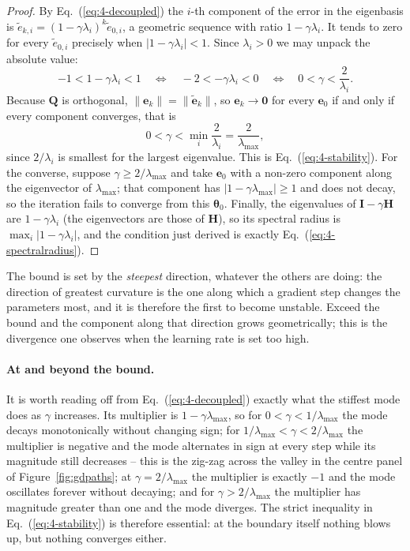 \begin{proof}
By Eq.~(\ref{eq:4-decoupled}) the $i$-th component of the error in the
eigenbasis is $\tilde{e}_{k,i}=(1-\gamma\lambda_i)^{k}\tilde{e}_{0,i}$, a
geometric sequence with ratio $1-\gamma\lambda_i$.  It tends to zero for
every $\tilde{e}_{0,i}$ precisely when $|1-\gamma\lambda_i|<1$.  Since
$\lambda_i>0$ we may unpack the absolute value:
\begin{equation*}
  -1 < 1-\gamma\lambda_i < 1
  \quad\Longleftrightarrow\quad
  -2 < -\gamma\lambda_i < 0
  \quad\Longleftrightarrow\quad
  0 < \gamma < \frac{2}{\lambda_i} .
\end{equation*}
Because $\bm{Q}$ is orthogonal, $\|\bm{e}_k\|=\|\tilde{\bm{e}}_k\|$, so
$\bm{e}_k\to\bm{0}$ for every $\bm{e}_0$ if and only if every component
converges, that is
\begin{equation*}
  0 < \gamma < \min_i\frac{2}{\lambda_i} = \frac{2}{\lambda_{\max}} ,
\end{equation*}
since $2/\lambda_i$ is smallest for the largest eigenvalue.  This is
Eq.~(\ref{eq:4-stability}).  For the converse, suppose
$\gamma\ge2/\lambda_{\max}$ and take $\bm{e}_0$ with a non-zero component along
the eigenvector of $\lambda_{\max}$; that component has
$|1-\gamma\lambda_{\max}|\ge1$ and does not decay, so the iteration fails to
converge from this $\bm{\theta}_0$.  Finally, the eigenvalues of
$\bm{I}-\gamma\bm{H}$ are $1-\gamma\lambda_i$ (the eigenvectors are those of
$\bm{H}$), so its spectral radius is $\max_i|1-\gamma\lambda_i|$, and the
condition just derived is exactly Eq.~(\ref{eq:4-spectralradius}).
\end{proof}

The bound is set by the \emph{steepest} direction, whatever the others are
doing: the direction of greatest curvature is the one along which a gradient
step changes the parameters most, and it is therefore the first to become
unstable.  Exceed the bound and the component along that direction grows
geometrically; this is the divergence one observes when the learning rate is
set too high.

\paragraph{At and beyond the bound.}
It is worth reading off from Eq.~(\ref{eq:4-decoupled}) exactly what the
stiffest mode does as $\gamma$ increases.  Its multiplier is
$1-\gamma\lambda_{\max}$, so for $0<\gamma<1/\lambda_{\max}$ the mode decays
monotonically without changing sign; for
$1/\lambda_{\max}<\gamma<2/\lambda_{\max}$ the multiplier is negative and the
mode alternates in sign at every step while its magnitude still decreases --
this is the zig-zag across the valley in the centre panel of
Figure~\ref{fig:gdpaths}; at $\gamma=2/\lambda_{\max}$ the multiplier is
exactly $-1$ and the mode oscillates forever without decaying; and for
$\gamma>2/\lambda_{\max}$ the multiplier has magnitude greater than one and
the mode diverges.  The strict inequality in Eq.~(\ref{eq:4-stability}) is
therefore essential: at the boundary itself nothing blows up, but nothing
converges either.

